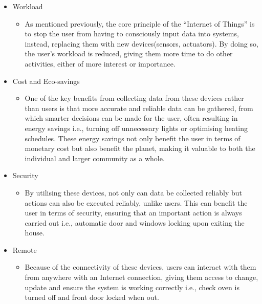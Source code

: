 \begin{itemize}
	\item Workload 
	\begin{itemize}
		\item As mentioned previously, the core principle of the ``Internet of Things'' is to stop the user from having to consciously input data into systems, instead, replacing them with new devices(sensors, actuators). By doing so, the user's workload is reduced, giving them more time to do other activities, either of more interest or importance. 
	\end{itemize}
	\item Cost and Eco-savings
	\begin{itemize}
		\item One of the key benefits from collecting data from these devices rather than users is that more accurate and reliable data can be gathered, from which smarter decisions can be made for the user, often resulting in energy savings i.e., turning off unnecessary lights or optimising heating schedules. These energy savings not only benefit the user in terms of monetary cost but also benefit the planet, making it valuable to both the individual and larger community as a whole.
	\end{itemize}
	\item Security
	\begin{itemize}
		\item By utilising these devices, not only can data be collected reliably but actions can also be executed reliably, unlike users. This can benefit the user in terms of security, ensuring that an important action is always carried out i.e., automatic door and windows locking upon exiting the house.
	\end{itemize}
	\item Remote
	\begin{itemize}
		\item Because of the connectivity of these devices, users can interact with them from anywhere with an Internet connection, giving them access to change, update and ensure the system is working correctly i.e., check oven is turned off and front door locked when out.
	\end{itemize}
\end{itemize}




